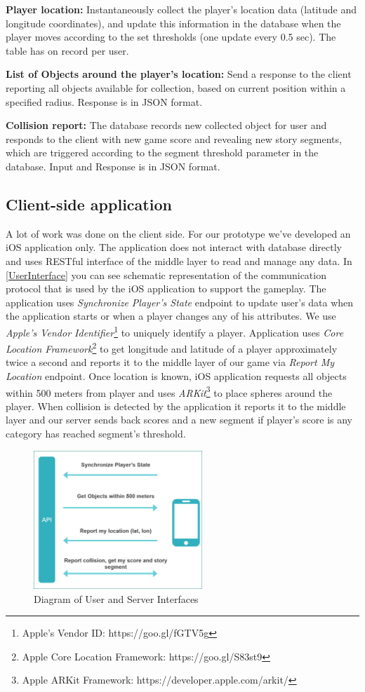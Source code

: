 \documentclass[conference]{IEEEtran}
\begin{document}
\textbf{Player location:} Instantaneously collect the player’s location data (latitude and longitude coordinates), and update this information in the database when the player moves according to the set thresholds (one update every 0.5 sec). The table has on record per user.

\textbf{List of Objects around the player’s location:} Send a response to the client reporting all objects available for collection, based on current position within a specified radius. Response is in JSON format.

\textbf{Collision report:} The database records new collected object for user and responds  to the client with new game score and revealing new story segments, which are triggered according to the segment threshold parameter in the database. Input and Response is in JSON format.

\subsection{Client-side application}

A lot of work was done on the client side. For our prototype we’ve developed an iOS application only. The application does not interact with database directly and uses RESTful interface of the middle layer to read and manage any data. 
In \autoref{UserInterface} you can see schematic representation of the communication protocol that is used by the iOS application to support the gameplay. 
The application uses \textit{Synchronize Player’s State} endpoint to update user's data when the application starts or when a player changes any of his attributes. We use \textit{Apple's Vendor Identifier}\footnote[1]{Apple's Vendor ID: https://goo.gl/fGTV5g} to uniquely identify a player. 
Application uses \textit{Core Location Framework}\footnote[2]{Apple Core Location Framework: https://goo.gl/S83st9} to get longitude and latitude of a player approximately twice a second and reports it to the middle layer of our game via \textit{Report My Location} endpoint. 
Once location is known, iOS application requests all objects within 500 meters from player and uses \textit{ARKit}\footnote[3]{Apple ARKit Framework: https://developer.apple.com/arkit/} to place spheres around the player. When collision is detected by the application it reports it to the middle layer and our server sends back scores and a new segment if player's score is any category has reached segment's threshold.

\begin{figure}
\centering
\includegraphics[width=2.5in]{imgs/UserInterface.png}
\caption{Diagram of User and Server Interfaces}
\label{UserInterface}
\end{figure}
\end{document}
